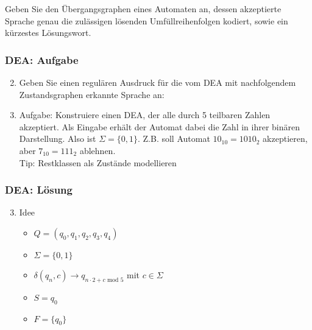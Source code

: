 \documentclass{beamer}
\begin{document}
{\begin{frame}
\begin{enumerate}
		Geben Sie den Übergangsgraphen eines Automaten an, dessen
		akzeptierte Sprache genau die zulässigen lösenden
		Umfüllreihenfolgen kodiert, sowie ein kürzestes Lösungswort.
	\end{enumerate}
\end{frame}
\begin{frame}
\frametitle{DEA: Aufgabe}
\begin{enumerate}
\setcounter{enumi}{1}
\item Geben Sie einen regulären Ausdruck für die vom DEA mit nachfolgendem Zustandsgraphen erkannte Sprache an:
\begin{center}
\end{center}
\end{enumerate}
\end{frame}
\begin{frame}
	\begin{enumerate}
	\setcounter{enumi}{2}
	\item Aufgabe: Konstruiere einen DEA, der alle durch 5 teilbaren Zahlen akzeptiert. Als Eingabe erhält der Automat dabei die Zahl in ihrer binären Darstellung. Also ist $\Sigma = \{0, 1\}$. Z.B. soll Automat $10_{10} = 1010_{2}$ akzeptieren, aber $7_{10} = 111_{2}$ ablehnen.
	\pause \\[10pt]
	Tip: Restklassen als Zustände modellieren
	\end{enumerate}
\end{frame}
\begin{frame}
	\frametitle{DEA: Lösung}
	\begin{enumerate}
	\setcounter{enumi}{2}
	\item Idee
		\begin{itemize}
		\item $Q = (q_0, q_1, q_2, q_3, q_4)$\\
		\item $\Sigma = \{0,1\}$
		\item $\delta(q_n, c) \rightarrow q_{n \cdot 2 + c\mbox{ mod }5}$ mit $c\in\Sigma$\\
		\item $S = q_0$\\
		\item $F = \{q_0\}$
		\end{itemize}
	\end{enumerate}
\end{frame}
}
\end{document}
